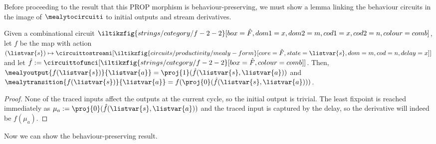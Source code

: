 Before proceeding to the result that this PROP morphism is behaviour-preserving,
we must show a lemma linking the behaviour circuits in the image of
\(\mealytocircuiti\) to initial outputs and stream derivatives.

\begin{proposition}
    \label{prop:mealy-form-image}
    Given a combinational circuit \(
        \iltikzfig{strings/category/f-2-2}[box=\hat{F},dom1=x,dom2=m,cod1=x,cod2=n,colour=comb]
    \), let \(f\) be the map with action \(
        (\listvar{s}) \mapsto
            \circuittostreami[
                \iltikzfig{circuits/productivity/mealy-form}[core=\hat{F},state=\listvar{s},dom=m,cod=n,delay=x]
            ]
    \) and let \(
        \hat{f}
        :=
        \circuittofunci[
            \iltikzfig{strings/category/f-2-2}[box=\hat{F},colour=comb]
        ]
    \).
    Then, \(
        \mealyoutput{f(\listvar{s})}{\listvar{a}}
        =
        \proj{1}(\hat{f}(\listvar{s}, \listvar{a}))
    \) and \(
        \mealytransition{f(\listvar{s})}{\listvar{a}}
        =
        f(\proj{0}(\hat{f}(\listvar{s}, \listvar{a})))
    \).
\end{proposition}
\begin{proof}
    None of the traced inputs affect the outputs at the
    current cycle, so the initial output is trivial.
    The least fixpoint is reached immediately as \(
        \mu_a := \proj{0}(\hat{f}(\listvar{s}, \listvar{a}))
    \) and the traced input is captured by the delay, so the derivative
    will indeed be \(f(\mu_a)\).
\end{proof}

Now we can show the behaviour-preserving result.

